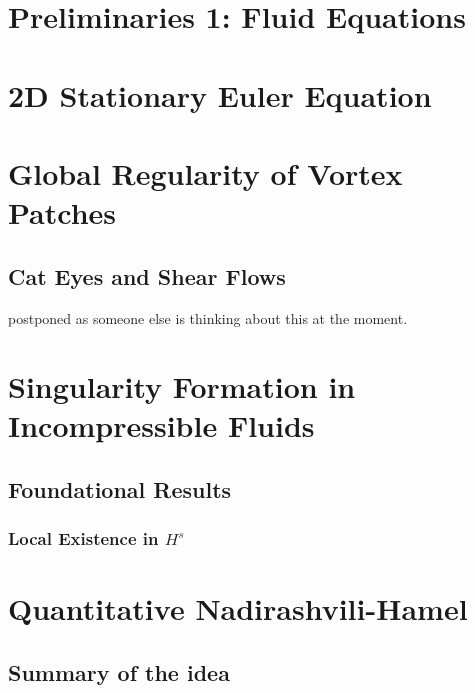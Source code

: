 


\rhead{\today} 

\chapter{Preliminaries 1: Fluid Equations}



\chapter{2D Stationary Euler Equation}

\chapter{Global Regularity of Vortex Patches}

\section{Cat Eyes and Shear Flows}

postponed as someone else is thinking about this at the moment.

\chapter{Singularity Formation in Incompressible Fluids}

\section{Foundational Results}

\subsection{Local Existence in $H^s$}

\chapter{Quantitative Nadirashvili-Hamel}

\section{Summary of the idea}

